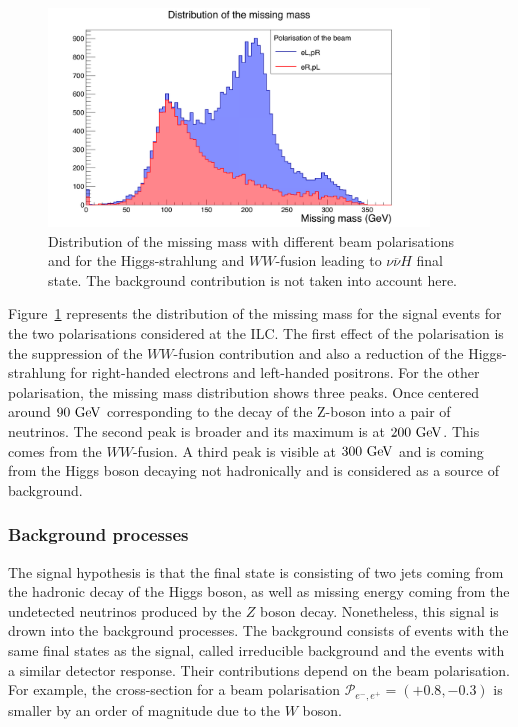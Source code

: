     \begin{figure}[!h]
      \centering
      \includegraphics[width = 0.9\textwidth]{Pictures/Higgs/mMiss.png}
      \caption{Distribution of the missing mass with different beam polarisations and for the Higgs-strahlung and $WW$-fusion leading to $\nu\overline{\nu}H$ final state.
      The background contribution is not taken into account here.}
      \label{fig:mMiss}
    \end{figure}

    Figure~\ref{fig:mMiss} represents the distribution of the missing mass for the signal events for the two polarisations considered at the \gls{ILC}.
    The first effect of the polarisation is the suppression of the $WW$-fusion contribution and also a reduction of the Higgs-strahlung for right-handed electrons and left-handed positrons.
    For the other polarisation, the missing mass distribution shows three peaks. 
    Once centered around $90~\rm{GeV}$ corresponding to the decay of the Z-boson into a pair of neutrinos.
    The second peak is broader and its maximum is at $200~\rm{GeV}$.
    This comes from the $WW$-fusion.
    A third peak is visible at $300~\rm{GeV}$ and is coming from the Higgs boson decaying not hadronically and is considered as a source of background.    

  \subsubsection{Background processes}

    The signal hypothesis is that the final state is consisting of two jets coming from the hadronic decay of the Higgs boson, as well as missing energy coming from the undetected neutrinos produced by the $Z$ boson decay.
    Nonetheless, this signal is drown into the background processes.
    The background consists of events with the same final states as the signal, called irreducible background and the events with a similar detector response.
    Their contributions depend on the beam polarisation.
    For example, the cross-section for a beam polarisation $\mathcal{P}_{e^-,e^+} = (+0.8,-0.3)$ is smaller by an order of magnitude due to the $W$ boson.

